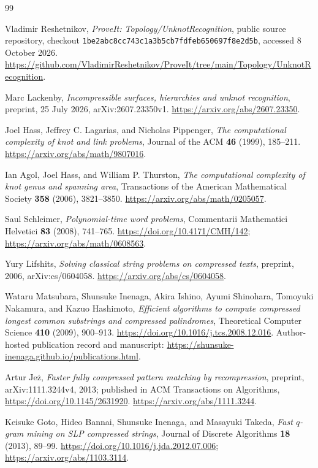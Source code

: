\begin{thebibliography}{99}
\raggedright
{}

Vladimir Reshetnikov, \emph{ProveIt: Topology/UnknotRecognition},
public source repository, checkout
\texttt{1be2abc8cc743c1a3b5cb7fdfeb650697f8e2d5b},
accessed 8 October 2026.
\url{https://github.com/VladimirReshetnikov/ProveIt/tree/main/Topology/UnknotRecognition}.

Marc Lackenby, \emph{Incompressible surfaces, hierarchies and unknot
recognition}, preprint, 25 July 2026, arXiv:2607.23350v1.
\url{https://arxiv.org/abs/2607.23350}.

Joel Hass, Jeffrey C. Lagarias, and Nicholas Pippenger,
\emph{The computational complexity of knot and link problems},
Journal of the ACM \textbf{46} (1999), 185--211.
\url{https://arxiv.org/abs/math/9807016}.

Ian Agol, Joel Hass, and William P. Thurston,
\emph{The computational complexity of knot genus and spanning area},
Transactions of the American Mathematical Society \textbf{358} (2006),
3821--3850.
\url{https://arxiv.org/abs/math/0205057}.

Saul Schleimer, \emph{Polynomial-time word problems},
Commentarii Mathematici Helvetici \textbf{83} (2008), 741--765.
\url{https://doi.org/10.4171/CMH/142};
\url{https://arxiv.org/abs/math/0608563}.

Yury Lifshits, \emph{Solving classical string problems on compressed
texts}, preprint, 2006, arXiv:cs/0604058.
\url{https://arxiv.org/abs/cs/0604058}.

Wataru Matsubara, Shunsuke Inenaga, Akira Ishino, Ayumi Shinohara,
Tomoyuki Nakamura, and Kazuo Hashimoto,
\emph{Efficient algorithms to compute compressed longest common
substrings and compressed palindromes},
Theoretical Computer Science \textbf{410} (2009), 900--913.
\url{https://doi.org/10.1016/j.tcs.2008.12.016}.
Author-hosted publication record and manuscript:
\url{https://shunsuke-inenaga.github.io/publications.html}.

Artur Je\.{z}, \emph{Faster fully compressed pattern matching by
recompression}, preprint, arXiv:1111.3244v4, 2013;
published in ACM Transactions on Algorithms,
\url{https://doi.org/10.1145/2631920}.
\url{https://arxiv.org/abs/1111.3244}.

Keisuke Goto, Hideo Bannai, Shunsuke Inenaga, and Masayuki Takeda,
\emph{Fast $q$-gram mining on SLP compressed strings},
Journal of Discrete Algorithms \textbf{18} (2013), 89--99.
\url{https://doi.org/10.1016/j.jda.2012.07.006};
\url{https://arxiv.org/abs/1103.3114}.


\end{thebibliography}
